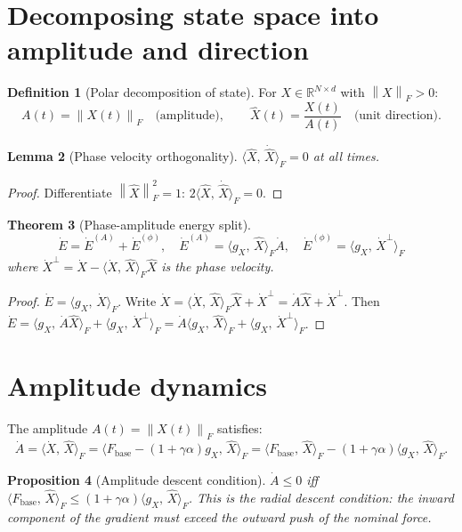 \documentclass[11pt,a4paper,openany]{book}
\newtheorem{theorem}{Theorem}[chapter]
\newtheorem{proposition}[theorem]{Proposition}
\newtheorem{lemma}[theorem]{Lemma}
\theoremstyle{definition}
\newtheorem{definition}[theorem]{Definition}
\newcommand{\R}{\mathbb{R}}
\newcommand{\norm}[1]{\left\|#1\right\|}
\newcommand{\inner}[2]{\langle #1,\,#2\rangle}
\newcommand{\Fbase}{F_{\mathrm{base}}}
\newcommand{\gX}{g_X}
\begin{document}
\section{Decomposing state space into amplitude and direction}

\begin{definition}[Polar decomposition of state]
For $X \in \R^{N\times d}$ with $\norm{X}_F > 0$:
\[
A(t) = \norm{X(t)}_F \quad\text{(amplitude)}, \qquad
\hat X(t) = \frac{X(t)}{A(t)} \quad\text{(unit direction)}.
\]
\end{definition}

\begin{lemma}[Phase velocity orthogonality]
$\inner{\hat X}{\dot{\hat X}}_F = 0$ at all times.
\end{lemma}

\begin{proof}
Differentiate $\norm{\hat X}_F^2 = 1$: $2\inner{\hat X}{\dot{\hat X}}_F = 0$.
\end{proof}

\begin{theorem}[Phase-amplitude energy split]
\label{thm:phasplit}
\[
\dot E = \dot E^{(A)} + \dot E^{(\phi)},
\quad
\dot E^{(A)} = \inner{\gX}{\hat X}_F\dot A,
\quad
\dot E^{(\phi)} = \inner{\gX}{\dot X^\perp}_F
\]
where $\dot X^\perp = \dot X - \inner{\dot X}{\hat X}_F\hat X$ is the phase velocity.
\end{theorem}

\begin{proof}
$\dot E = \inner{\gX}{\dot X}_F$.
Write $\dot X = \inner{\dot X}{\hat X}_F\hat X + \dot X^\perp = \dot A\hat X + \dot X^\perp$.
Then $\dot E = \inner{\gX}{\dot A\hat X}_F + \inner{\gX}{\dot X^\perp}_F
= \dot A\inner{\gX}{\hat X}_F + \inner{\gX}{\dot X^\perp}_F$.
\end{proof}

\section{Amplitude dynamics}

The amplitude $A(t) = \norm{X(t)}_F$ satisfies:
\[
\dot A = \inner{\dot X}{\hat X}_F = \inner{\Fbase - (1+\gamma\alpha)\gX}{\hat X}_F
= \inner{\Fbase}{\hat X}_F - (1+\gamma\alpha)\inner{\gX}{\hat X}_F.
\]

\begin{proposition}[Amplitude descent condition]
$\dot A \leq 0$ iff $\inner{\Fbase}{\hat X}_F \leq (1+\gamma\alpha)\inner{\gX}{\hat X}_F$.
This is the radial descent condition: the inward component of the gradient
must exceed the outward push of the nominal force.
\end{proposition}
\end{document}
